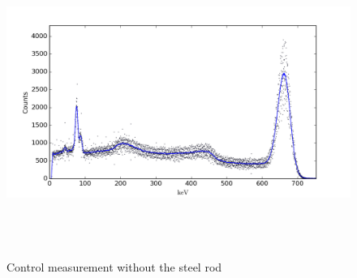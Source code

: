 \documentclass[a4paper]{scrartcl}
\begin{document}
\begin{figure}
    \centering
    \includegraphics[height = 10cm]{data/0-no-rod.png}
    \caption{Control measurement without the steel rod}
    \label{fig:control}
\end{figure}
\end{document}
